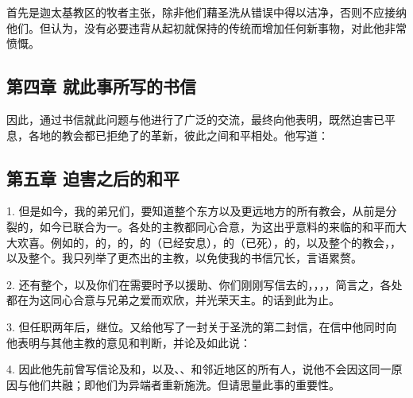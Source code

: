 首先是迦太基教区的牧者主张，除非他们藉圣洗从错误中得以洁净，否则不应接纳他们。但认为，没有必要违背从起初就保持的传统而增加任何新事物，对此他非常愤慨。\par


\subsection{第四章 就此事所写的书信}

因此，通过书信就此问题与他进行了广泛的交流，最终向他表明，既然迫害已平息，各地的教会都已拒绝了的革新，彼此之间和平相处。他写道：\par


\subsection{第五章 迫害之后的和平}

1. 但是如今，我的弟兄们，要知道整个东方以及更远地方的所有教会，从前是分裂的，如今已联合为一。各处的主教都同心合意，为这出乎意料的来临的和平而大大欢喜。例如的，的，的，的（已经安息），的（已死），的，以及整个的教会，，以及整个。我只列举了更杰出的主教，以免使我的书信冗长，言语累赘。\par

2. 还有整个，以及你们在需要时予以援助、你们刚刚写信去的，，，，简言之，各处都在为这同心合意与兄弟之爱而欢欣，并光荣天主。的话到此为止。\par

3. 但任职两年后，继位。又给他写了一封关于圣洗的第二封信，在信中他同时向他表明与其他主教的意见和判断，并论及如此说：\par

4. 因此他先前曾写信论及和，以及、、和邻近地区的所有人，说他不会因这同一原因与他们共融；即他们为异端者重新施洗。但请思量此事的重要性。\par

